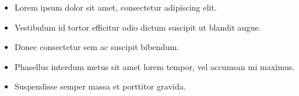 \begin{itemize}
    \item Lorem ipsum dolor sit amet, consectetur adipiscing elit.
    \item Vestibulum id tortor efficitur odio dictum suscipit ut blandit augue.
    \item Donec consectetur sem ac suscipit bibendum.
    \item Phasellus interdum metus sit amet lorem tempor, vel accumsan mi maximus.
    \item Suspendisse semper massa et porttitor gravida.
\end{itemize}{}
